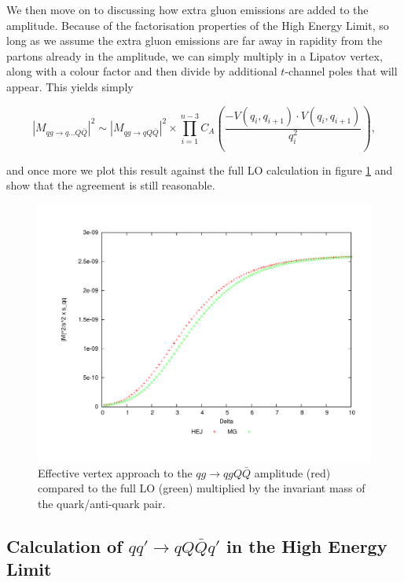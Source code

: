 We then move on to discussing how extra gluon emissions are added to the amplitude. Because of the factorisation properties of the High Energy Limit, so long as we assume the extra gluon emissions are far away in rapidity from the partons already in the amplitude, we can simply multiply in a Lipatov vertex, along with a colour factor and then divide by additional $t$-channel poles that will appear. This yields simply 

\begin{equation}
|M_{qg \to q...Q\bar{Q}}|^2 \sim |M_{qg \to qQ\bar{Q}}|^2 \times \prod_{i=1}^{n-3}  C_A \left(\frac{-V(q_i,q_{i+1}) \cdot V(q_i,q_{i+1})}{q_i^2} \right),
\end{equation}

and once more we plot this result against the full LO calculation in figure \ref{fig:qg_qqq_emis} and show that the agreement is still reasonable. 

\begin{figure}[H]
\centering
\includegraphics[scale=0.45]{Images/qg_qgQQx_sqq.pdf}
\caption{Effective vertex approach to the $qg \to qgQ\bar{Q}$ amplitude (red) compared to the full LO (green) multiplied by the invariant mass of the quark/anti-quark pair.}
\label{fig:qg_qqq_emis}
\end{figure}

\subsection{Calculation of $qq' \to qQ\bar{Q}q'$ in the High Energy Limit}

